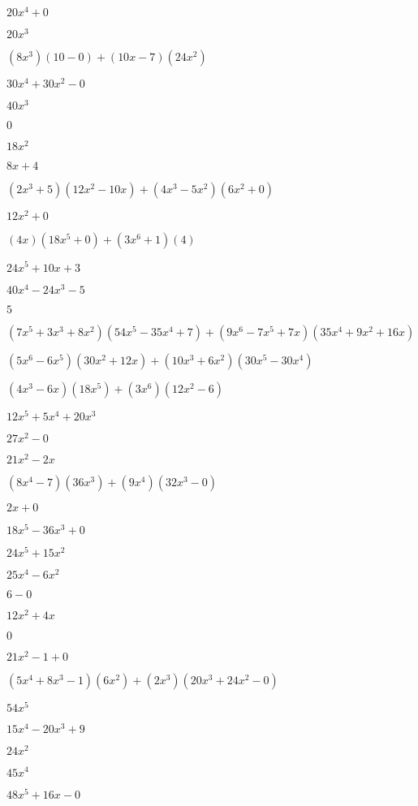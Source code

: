 \documentclass{article}
\begin{document}
\begin{multicols}{2}
$20x^{4}+0$\item $20x^{3}$\item $(8x^{3})(10-0)+(10x-7)(24x^{2})$\item $30x^{4}+30x^{2}-0$\item $40x^{3}$\item $0$\item $18x^{2}$\item $8x+4$\item $(2x^{3}+5)(12x^{2}-10x)+(4x^{3}-5x^2)(6x^{2}+0)$\item $12x^{2}+0$\item $(4x)(18x^{5}+0)+(3x^{6}+1)(4)$\item $24x^{5}+10x+3$\item $40x^{4}-24x^{3}-5$\item $5$\item $(7x^{5}+3x^{3}+8x^2)(54x^{5}-35x^{4}+7)+(9x^{6}-7x^{5}+7x)(35x^{4}+9x^{2}+16x)$\item $(5x^{6}-6x^{5})(30x^{2}+12x)+(10x^{3}+6x^2)(30x^{5}-30x^{4})$\item $(4x^{3}-6x)(18x^{5})+(3x^{6})(12x^{2}-6)$\item $12x^{5}+5x^{4}+20x^{3}$\item $27x^{2}-0$\item $21x^{2}-2x$\item $(8x^{4}-7)(36x^{3})+(9x^{4})(32x^{3}-0)$\item $2x+0$\item $18x^{5}-36x^{3}+0$\item $24x^{5}+15x^{2}$\item $25x^{4}-6x^{2}$\item $6-0$\item $12x^{2}+4x$\item $0$\item $21x^{2}-1+0$\item $(5x^{4}+8x^{3}-1)(6x^{2})+(2x^{3})(20x^{3}+24x^{2}-0)$\item $54x^{5}$\item $15x^{4}-20x^{3}+9$\item $24x^{2}$\item $45x^{4}$\item $48x^{5}+16x-0$\item 
\end{multicols}
\end{document}
